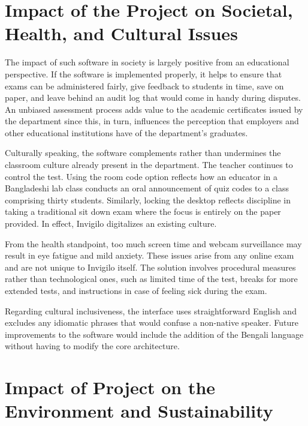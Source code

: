 \documentclass[12pt, a4paper]{report}
\begin{document}
\section{Impact of the Project on Societal, Health, and Cultural Issues}

\begin{justify}
  {\fontsize{12}{18}\selectfont
    The impact of such software in society is largely positive from an educational perspective. If the software is implemented properly, it helps to ensure that exams can be administered fairly, give feedback to students in time, save on paper, and leave behind an audit log that would come in handy during disputes. An unbiased assessment process adds value to the academic certificates issued by the department since this, in turn, influences the perception that employers and other educational institutions have of the department’s graduates.

    Culturally speaking, the software complements rather than undermines the classroom culture already present in the department. The teacher continues to control the test. Using the room code option reflects how an educator in a Bangladeshi lab class conducts an oral announcement of quiz codes to a class comprising thirty students. Similarly, locking the desktop reflects discipline in taking a traditional sit down exam where the focus is entirely on the paper provided. In effect, Invigilo digitalizes an existing culture.

    From the health standpoint, too much screen time and webcam surveillance may result in eye fatigue and mild anxiety. These issues arise from any online exam and are not unique to Invigilo itself. The solution involves procedural measures rather than technological ones, such as limited time of the test, breaks for more extended tests, and instructions in case of feeling sick during the exam.

    Regarding cultural inclusiveness, the interface uses straightforward English and excludes any idiomatic phrases that would confuse a non-native speaker. Future improvements to the software would include the addition of the Bengali language without having to modify the core architecture.
  }
\end{justify}

\section{Impact of Project on the Environment and Sustainability}
\end{document}
